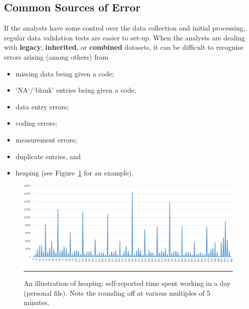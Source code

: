\subsection{Common Sources of Error}
If the analysts have some control over the data collection and initial processing, regular data validation tests are easier to set-up. When the analysts are dealing with \textbf{legacy}, \textbf{inherited}, or \textbf{combined} datasets, it can be difficult to recognise errors arising (among others) from \begin{itemize}[noitemsep] \item missing data being given a code; \item `NA`/`blank' entries being given a code; \item data entry errors;\item coding errors;\item measurement errors;\item duplicate entries, and \item heaping (see Figure~\ref{fig:heaping} for an example).\end{itemize} 
\begin{figure}[t]
\centering
\includegraphics[width=\textwidth]{Images/heaping.png}
\caption[\small An illustration of heaping]{\small An illustration of heaping: self-reported time spent working in a day (personal file). Note the rounding off at various multiples of 5 minutes.} \hrule \label{fig:heaping}
\end{figure}
\afterpage{\FloatBarrier}
